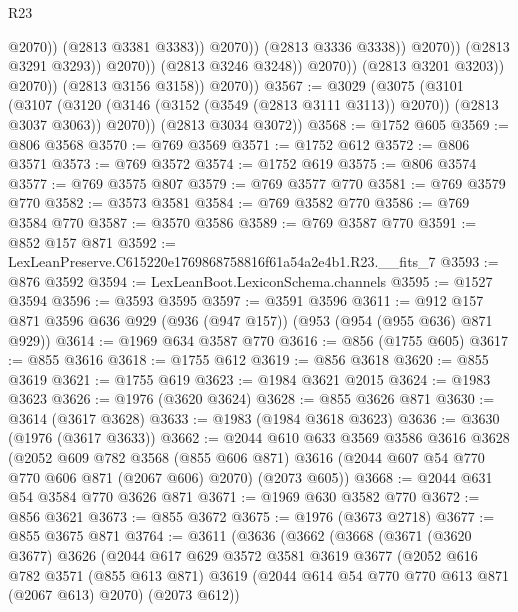 \begin{lexlean}{R23}
\begin{coremodule}
                                            @2070))
                                        (@2813 @3381 @3383))
                                      @2070))
                                  (@2813 @3336 @3338))
                                @2070))
                            (@2813 @3291 @3293))
                          @2070))
                      (@2813 @3246 @3248))
                    @2070))
                (@2813 @3201 @3203))
              @2070))
          (@2813 @3156 @3158))
        @2070))
@3567 := @3029
    (@3075
      (@3101
        (@3107 (@3120 (@3146 (@3152 (@3549 (@2813 @3111 @3113)) @2070)) (@2813 @3037 @3063)) @2070))
      (@2813 @3034 @3072))
@3568 := @1752 @605
@3569 := @806 @3568
@3570 := @769 @3569
@3571 := @1752 @612
@3572 := @806 @3571
@3573 := @769 @3572
@3574 := @1752 @619
@3575 := @806 @3574
@3577 := @769 @3575 @807
@3579 := @769 @3577 @770
@3581 := @769 @3579 @770
@3582 := @3573 @3581
@3584 := @769 @3582 @770
@3586 := @769 @3584 @770
@3587 := @3570 @3586
@3589 := @769 @3587 @770
@3591 := @852 @157 @871
@3592 := LexLeanPreserve.C615220e1769868758816f61a54a2e4b1.R23.__fits_7
@3593 := @876 @3592
@3594 := LexLeanBoot.LexiconSchema.channels
@3595 := @1527 @3594
@3596 := @3593 @3595
@3597 := @3591 @3596
@3611 := @912 @157 @871 @3596 @636 @929 (@936 (@947 @157)) (@953 (@954 (@955 @636) @871 @929))
@3614 := @1969 @634 @3587 @770
@3616 := @856 (@1755 @605)
@3617 := @855 @3616
@3618 := @1755 @612
@3619 := @856 @3618
@3620 := @855 @3619
@3621 := @1755 @619
@3623 := @1984 @3621 @2015
@3624 := @1983 @3623
@3626 := @1976 (@3620 @3624)
@3628 := @855 @3626 @871
@3630 := @3614 (@3617 @3628)
@3633 := @1983 (@1984 @3618 @3623)
@3636 := @3630 (@1976 (@3617 @3633))
@3662 := @2044
    @610
    @633
    @3569
    @3586
    @3616
    @3628
    (@2052
      @609
      @782
      @3568
      (@855 @606 @871)
      @3616
      (@2044 @607 @54 @770 @770 @606 @871 (@2067 @606) @2070)
      (@2073 @605))
@3668 := @2044 @631 @54 @3584 @770 @3626 @871
@3671 := @1969 @630 @3582 @770
@3672 := @856 @3621
@3673 := @855 @3672
@3675 := @1976 (@3673 @2718)
@3677 := @855 @3675 @871
@3764 := @3611
    (@3636
      (@3662
        (@3668
          (@3671
            (@3620 @3677)
            @3626
            (@2044
              @617
              @629
              @3572
              @3581
              @3619
              @3677
              (@2052
                @616
                @782
                @3571
                (@855 @613 @871)
                @3619
                (@2044 @614 @54 @770 @770 @613 @871 (@2067 @613) @2070)
                (@2073 @612))

\end{coremodule}
\end{lexlean}

